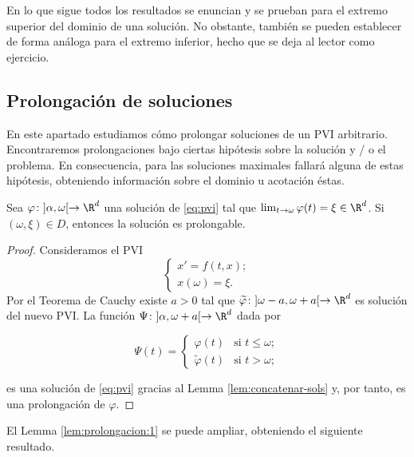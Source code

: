 \documentclass{article}
\begin{document}
En lo que sigue todos los resultados se enuncian y se prueban para el extremo superior del dominio
de una solución. No obstante, también se pueden establecer de forma análoga para el extremo
inferior, hecho que se deja al lector como ejercicio.

\subsection{Prolongación de soluciones}

En este apartado estudiamos cómo prolongar soluciones de un PVI arbitrario. Encontraremos
prolongaciones bajo ciertas hipótesis sobre la solución y / o el problema. En consecuencia, para las
soluciones maximales fallará alguna de estas hipótesis, obteniendo información sobre el dominio u
acotación éstas.

\begin{lemma} \label{lem:prolongacion:1} Sea $\varphi \colon ]\alpha, \omega[ \to \R^d$ una solución
  de \eqref{eq:pvi} tal que $\lim_{t \to \omega} \varphi(t) = \xi \in \R^d$. Si
  $(\omega, \xi) \in D$, entonces la solución es prolongable.
\end{lemma}
\begin{proof}
  Consideramos el PVI
  \[\begin{cases}x' = f(t, x); \\ x(\omega) = \xi. \end{cases}\]
  Por el Teorema de Cauchy existe $a > 0$ tal que
  $\widetilde{\varphi} \colon ]\omega-a, \omega+a[ \to \R^d$ es solución del nuevo PVI.  La función
  $\Psi \colon ]\alpha, \omega+a[ \to \R^d$ dada por
  
  \[\Psi(t) = \begin{cases} \varphi(t) & \text{si } t \le \omega; \\ \widetilde{\varphi}(t) &
      \text{si } t > \omega;\end{cases}\]

  es una solución de \eqref{eq:pvi} gracias al Lemma \ref{lem:concatenar-sols} y, por tanto, es una
  prolongación de $\varphi$.
\end{proof}

El Lemma \ref{lem:prolongacion:1} se puede ampliar, obteniendo el siguiente resultado.
\end{document}
